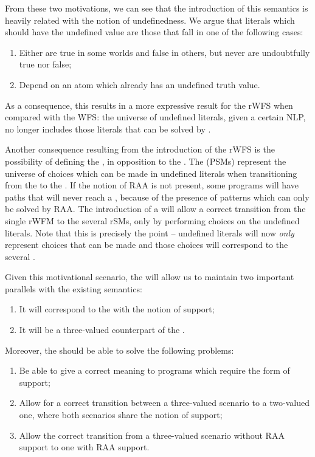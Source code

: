 From these two motivations, we can see that the introduction of this semantics is heavily related with the notion of undefinedness. We argue that literals which should have the undefined value are those that fall in one of the following cases:

\begin{enumerate}
	\item Either are true in some worlds and false in others, but never are undoubtfully true nor false;
	\item Depend on an atom which already has an undefined truth value.
\end{enumerate}

As a consequence, this results in a more expressive result for the rWFS when compared with the WFS: the universe of undefined literals, given a certain NLP, no longer includes those literals that can be solved by \raa.

Another consequence resulting from the introduction of the rWFS is the possibility of defining the \RPSMs, in opposition to the \PSMs. The \PSMs (PSMs) represent the universe of choices which can be made in undefined literals when transitioning from the \wfm to the \sms. If the notion of RAA is not present, some programs will have paths that will never reach a \sm, because of the presence of patterns which can only be solved by RAA. The introduction of a \rwfs will allow a correct transition from the single rWFM to the several rSMs, only by performing choices on the undefined literals. Note that this is precisely the point -- undefined literals will now \emph{only} represent choices that can be made and those choices will correspond to the several \rsms.

Given this motivational scenario, the \rwfs will allow us to maintain two important parallels with the existing semantics:

\begin{enumerate}
	\item It will correspond to the \wfs with the \raa notion of support;
	\item It will be a three-valued counterpart of the \rsms.
\end{enumerate}

Moreover, the \rwfs should be able to solve the following problems:

\begin{enumerate}
	\item Be able to give a correct meaning to programs which require the \raa form of support;
	\item Allow for a correct transition between a three-valued scenario to a two-valued one, where both scenarios share the \raa notion of support;
	\item Allow the correct transition from a three-valued scenario without RAA support to one with RAA support.
\end{enumerate}

